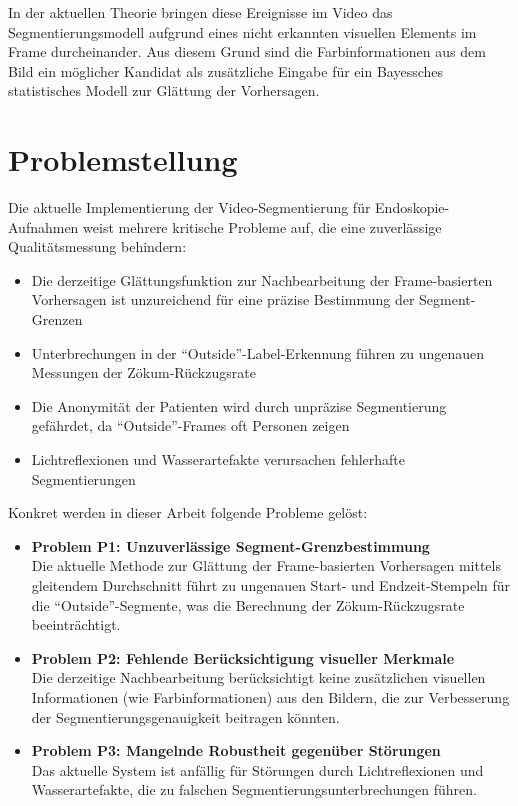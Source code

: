 In der aktuellen Theorie bringen diese Ereignisse im Video das Segmentierungsmodell aufgrund eines nicht erkannten visuellen Elements im Frame durcheinander. Aus diesem Grund sind die Farbinformationen aus dem Bild ein möglicher Kandidat als zusätzliche Eingabe für ein Bayessches statistisches Modell zur Glättung der Vorhersagen.

\section{Problemstellung}

Die aktuelle Implementierung der Video-Segmentierung für Endoskopie-Aufnahmen weist mehrere kritische Probleme auf, die eine zuverlässige Qualitätsmessung behindern:

\begin{itemize}
\item Die derzeitige Glättungsfunktion zur Nachbearbeitung der Frame-basierten Vorhersagen ist unzureichend für eine präzise Bestimmung der Segment-Grenzen
\item Unterbrechungen in der \enquote{Outside}-Label-Erkennung führen zu ungenauen Messungen der Zökum-Rückzugsrate
\item Die Anonymität der Patienten wird durch unpräzise Segmentierung gefährdet, da \enquote{Outside}-Frames oft Personen zeigen
\item Lichtreflexionen und Wasserartefakte verursachen fehlerhafte Segmentierungen
\end{itemize}

Konkret werden in dieser Arbeit folgende Probleme gelöst:

\begin{itemize}
\item \textbf{Problem P1: Unzuverlässige Segment-Grenzbestimmung} \\
Die aktuelle Methode zur Glättung der Frame-basierten Vorhersagen mittels gleitendem Durchschnitt führt zu ungenauen Start- und Endzeit-Stempeln für die \enquote{Outside}-Segmente, was die Berechnung der Zökum-Rückzugsrate beeinträchtigt.

\item \textbf{Problem P2: Fehlende Berücksichtigung visueller Merkmale} \\
Die derzeitige Nachbearbeitung berücksichtigt keine zusätzlichen visuellen Informationen (wie Farbinformationen) aus den Bildern, die zur Verbesserung der Segmentierungsgenauigkeit beitragen könnten.

\item \textbf{Problem P3: Mangelnde Robustheit gegenüber Störungen} \\
Das aktuelle System ist anfällig für Störungen durch Lichtreflexionen und Wasserartefakte, die zu falschen Segmentierungsunterbrechungen führen.
\end{itemize}

